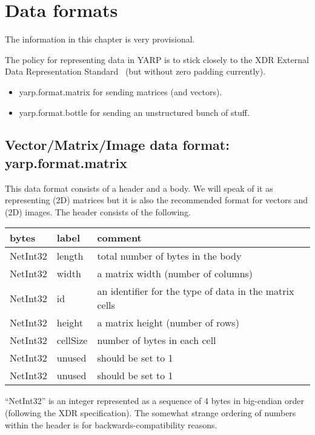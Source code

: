 
\chapter{Data formats}

The information in this chapter is very provisional.


The policy for representing data in YARP is to stick closely to the XDR 
External Data Representation Standard~\cite{srinivasan95xdr} (but
without zero padding currently).

\begin{itemize}
\item yarp.format.matrix for sending matrices (and vectors).
\item yarp.format.bottle for sending an unstructured bunch of stuff.
\end{itemize}




\section{Vector/Matrix/Image data format: yarp.format.matrix}

This data format consists of a header and a body.  We will speak of it
as representing (2D) matrices but it is also the recommended format for
vectors and (2D) images.  The header consists of the following.

\begin{tabular}{|l|l|l|}
\hline
{\bf bytes} & {\bf label} & {\bf comment} \\ \hline \hline
NetInt32 & length & total number of bytes in the body \\
NetInt32 & width & a matrix width (number of columns) \\
NetInt32 & id & an identifier for the type of data in the matrix cells \\
NetInt32 & height & a matrix height (number of rows) \\
NetInt32 & cellSize & number of bytes in each cell \\
NetInt32 & unused & should be set to 1 \\
NetInt32 & unused & should be set to 1 \\ \hline
\end{tabular}

``NetInt32'' is an integer represented as a
sequence of 4 bytes in big-endian order (following the XDR specification).
The somewhat strange ordering of numbers within the
header is for backwards-compatibility reasons.

